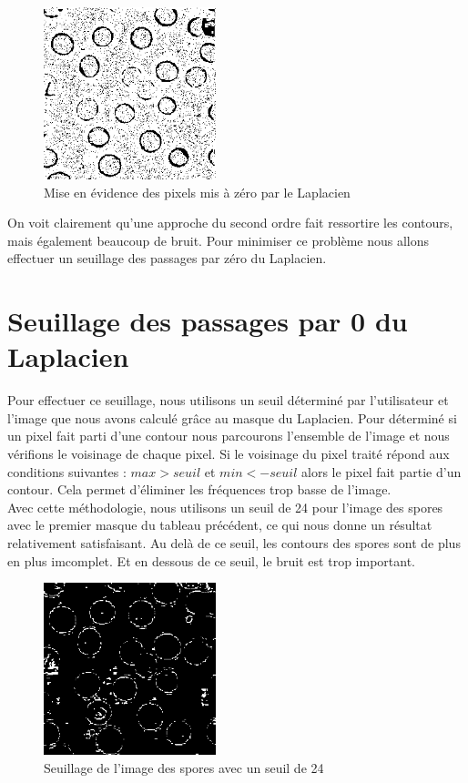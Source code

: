 \documentclass[a4paper,11pt]{article}
\begin{document}
  \begin{figure}[H]
   \center
   \includegraphics[width=5cm]{../laplacien0.png}
   \caption{Mise en évidence des pixels mis à zéro par le Laplacien}
  \end{figure}

  On voit clairement qu'une approche du second ordre fait ressortire les contours, mais également beaucoup de bruit. 
  Pour minimiser ce problème nous allons effectuer un seuillage des passages par zéro du Laplacien.
  
  \section{Seuillage des passages par 0 du Laplacien}
  Pour effectuer ce seuillage, nous utilisons un seuil déterminé par l'utilisateur et l'image que nous avons
  calculé grâce au masque du Laplacien. Pour déterminé si un pixel fait parti d'une contour nous parcourons l'ensemble de l'image 
  et nous vérifions le voisinage de chaque pixel. Si le voisinage du pixel traité répond aux conditions suivantes : $max > seuil$ et $min < -seuil$
  alors le pixel fait partie d'un contour. Cela permet d'éliminer les fréquences trop basse de l'image.\\ 
  
  Avec cette méthodologie, nous utilisons un seuil de 24 pour l'image des spores avec le premier masque du tableau précédent, ce qui nous donne un résultat relativement
  satisfaisant. Au delà de ce seuil, les contours des spores sont de plus en plus imcomplet. Et en dessous de ce seuil, le bruit est
  trop important.
  
  \begin{figure}[H]
   \center
   \includegraphics[width=5cm]{../seuillage24.png}
   \caption{Seuillage de l'image des spores avec un seuil de 24}
  \end{figure}
  
\end{document}
